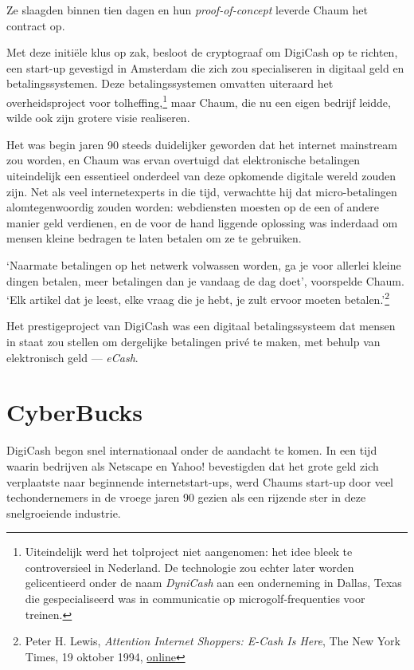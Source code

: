 \documentclass[
  a5paper,
  smalldemyvopaper,11pt,twoside,onecolumn,openright,extrafontsizes,
hidelinks]{memoir}
\begin{document}
Ze slaagden binnen tien dagen en hun \emph{proof-of-concept} leverde
Chaum het contract op.

Met deze initiële klus op zak, besloot de cryptograaf om DigiCash op te
richten, een start-up gevestigd in Amsterdam die zich zou specialiseren
in digitaal geld en betalingssystemen. Deze betalingssystemen omvatten
uiteraard het overheidsproject voor tolheffing,\footnote{Uiteindelijk
  werd het tolproject niet aangenomen: het idee bleek te controversieel
  in Nederland. De technologie zou echter later worden gelicentieerd
  onder de naam \emph{DyniCash} aan een onderneming in Dallas, Texas die
  gespecialiseerd was in communicatie op microgolf-frequenties voor
  treinen.} maar Chaum, die nu een eigen bedrijf leidde, wilde ook zijn
grotere visie realiseren.

Het was begin jaren 90 steeds duidelijker geworden dat het internet
mainstream zou worden, en Chaum was ervan overtuigd dat elektronische
betalingen uiteindelijk een essentieel onderdeel van deze opkomende
digitale wereld zouden zijn. Net als veel internetexperts in die tijd,
verwachtte hij dat micro-betalingen alomtegenwoordig zouden worden:
webdiensten moesten op de een of andere manier geld verdienen, en de
voor de hand liggende oplossing was inderdaad om mensen kleine bedragen
te laten betalen om ze te gebruiken.

`Naarmate betalingen op het netwerk volwassen worden, ga je voor
allerlei kleine dingen betalen, meer betalingen dan je vandaag de dag
doet', voorspelde Chaum. `Elk artikel dat je leest, elke vraag die je
hebt, je zult ervoor moeten betalen.'\footnote{Peter H. Lewis,
  \emph{Attention Internet Shoppers: E-Cash Is Here}, The New York
  Times, 19 oktober 1994,
  \href{https://www.nytimes.com/1994/10/19/business/attention-internet-shoppers-e-cash-is-here.html}{online}}

Het prestigeproject van DigiCash was een digitaal betalingssysteem dat
mensen in staat zou stellen om dergelijke betalingen privé te maken, met
behulp van elektronisch geld --- \emph{eCash}.

\section{CyberBucks}\label{cyberbucks}

DigiCash begon snel internationaal onder de aandacht te komen. In een
tijd waarin bedrijven als Netscape en Yahoo! bevestigden dat het grote
geld zich verplaatste naar beginnende internetstart-ups, werd Chaums
start-up door veel techondernemers in de vroege jaren 90 gezien als een
rijzende ster in deze snelgroeiende industrie.
\end{document}
